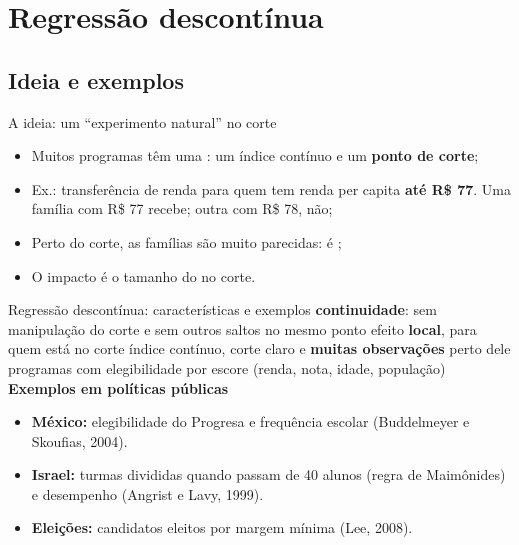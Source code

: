 \section[RDD]{Regressão descontínua}
\subsection{Ideia e exemplos}

\begin{frame}{A ideia: um ``experimento natural'' no corte}
  \begin{itemize}
    \item Muitos programas têm uma : um índice contínuo e um \textbf{ponto de corte};
    \item Ex.: transferência de renda para quem tem renda per capita \textbf{até R\$ 77}. Uma família com R\$ 77 recebe; outra com R\$ 78, não;
    \item Perto do corte, as famílias são muito parecidas: é ;
    \item O impacto é o tamanho do  no corte.
  \end{itemize}
\end{frame}

\begin{frame}{Regressão descontínua: características e exemplos}
        {\textbf{continuidade}: sem manipulação do corte e sem outros saltos no mesmo ponto}
        {efeito \textbf{local}, para quem está no corte}
        {índice contínuo, corte claro e \textbf{muitas observações} perto dele}
        {programas com elegibilidade por escore (renda, nota, idade, população)}
  \vspace{0.05cm}
  \textbf{\footnotesize\color{azul}Exemplos em políticas públicas}\par
    \scriptsize
    \begin{itemize}
      \item \textbf{México:} elegibilidade do Progresa e frequência escolar (Buddelmeyer e Skoufias, 2004).
      \item \textbf{Israel:} turmas divididas quando passam de 40 alunos (regra de Maimônides) e desempenho (Angrist e Lavy, 1999).
      \item \textbf{Eleições:} candidatos eleitos por margem mínima (Lee, 2008).
    \end{itemize}
\end{frame}


